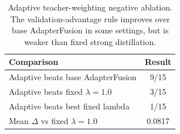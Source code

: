 \begin{table}[t]
\centering
\small
\caption{Adaptive teacher-weighting negative ablation. The validation-advantage rule improves over base AdapterFusion in some settings, but is weaker than fixed strong distillation.}
\label{tab:adaptive_summary}
\begin{tabular}{lc}
\toprule
Comparison & Result \\
\midrule
Adaptive beats base AdapterFusion & 9/15 \\
Adaptive beats fixed $\lambda=1.0$ & 3/15 \\
Adaptive beats best fixed lambda & 1/15 \\
Mean $\Delta$ vs fixed $\lambda=1.0$ & 0.0817 \\
\bottomrule
\end{tabular}
\end{table}
